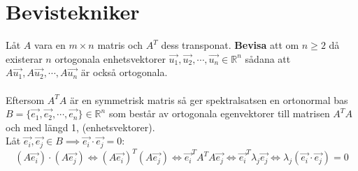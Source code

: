 \documentclass{report}
\begin{document}
\chapter{Bevistekniker}
{
	Låt $A$ vara en $m \times n$ matris och $A^T$ dess transponat. \textbf{Bevisa} att om $n \geq 2$ då existerar $n$ ortogonala enhetsvektorer $\vec{u_1}, \vec{u_2}, \cdots, \vec{u_n} \in \mathbb{R}^n$ sådana att $A\vec{u_1}, A\vec{u_2}, \cdots, A\vec{u_n}$ är också ortogonala.\\\\
	
	Eftersom $A^T A$ är en symmetrisk matris så ger spektralsatsen en ortonormal bas $B = \{\vec{e_1}, \vec{e_2}, \cdots, \vec{e_n}\} \in \mathbb{R}^n$ som består av ortogonala egenvektorer till matrisen $A^T A$ och med längd 1, (enhetsvektorer).\\
	Låt $\vec{e_i}, \vec{e_j} \in B \implies \vec{e_i} \cdot \vec{e_j} = 0$:\\

\begin{equation*}
	(A\vec{e_i}) \cdot (A\vec{e_j}) \iff (A\vec{e_i})^T (A\vec{e_j}) \iff \vec{e_i}^T A^T A \vec{e_j} \iff \vec{e_i}^T \lambda_j \vec{e_j} \iff \lambda_j (\vec{e_i} \cdot \vec{e_j}) = 0
\end{equation*}
}
\end{document}

